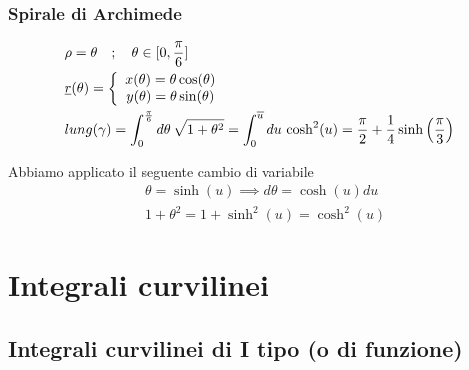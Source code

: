 \subsubsection{Spirale di Archimede}

\begin{align}
{}&\rho = \theta \quad ; \quad \theta\in[0,\frac{\pi}{6}]\\
&\underline{r}(\theta)=\left\{\begin{array}{cc} x(\theta)= \theta\cos(\theta)  \\ y(\theta) = \theta\sin (\theta) \end{array}\right.\\
& lung(\gamma)= \int_{0}^{\frac{\pi}{6}}d\theta \, \sqrt{1 + \theta^2} = \int_{0}^{\overline{u}}du \, \cosh^2(u) = \frac{\pi}{2} + \frac{1}{4}\sinh \left(\frac{\pi}{3}\right)
\end{align}

Abbiamo applicato il seguente cambio di variabile
\begin{align}
{}&\theta = \sinh(u) \implies d\theta = \cosh(u)du \\
&1 + \theta^2= 1 + \sinh^2(u) = \cosh^2(u)
\end{align}


\newpage

\section{Integrali curvilinei}


\subsection{Integrali curvilinei di I tipo (o di funzione)}


